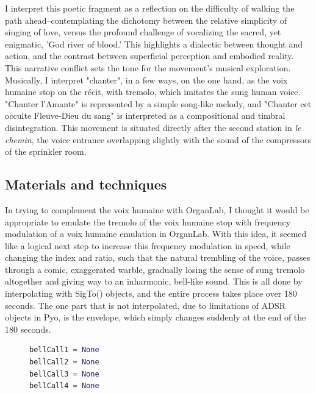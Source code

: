 \documentclass[12pt,twoside,maitrise]{dms_ks}
\theoremstyle{definition}
\begin{document}
{I interpret this poetic fragment as a reflection on the difficulty of walking the path ahead--contemplating the dichotomy between the relative simplicity of singing of love, versus the profound challenge of vocalizing the sacred, yet enigmatic, 'God river of blood.'  
This highlights a dialectic between thought and action, and the contrast between superficial perception and embodied reality.  
This narrative conflict sets the tone for the movement's musical exploration.  
Musically, I interpret "chanter", in a few ways, on the one hand, as the voix humaine stop on the récit, with tremolo, which imitates the sung human voice.  
"Chanter l'Amante" is represented by a simple song-like melody, and "Chanter cet occulte Fleuve-Dieu du sang" is interpreted as a compositional and timbral disintegration. 
This movement is situated directly after the second station in \textit{le chemin}, the voice entrance overlapping slightly with the sound of the compressors of the sprinkler room.

\subsection{Materials and techniques}

In trying to complement the voix humaine with OrganLab, I thought it would be appropriate to emulate the tremolo of the voix humaine stop with frequency modulation of a voix humaine emulation in OrganLab.  
With this idea, it seemed like a logical next step to increase this frequency modulation in speed, while changing the index and ratio, such that the natural trembling of the voice, passes through a comic, exaggerated warble, gradually losing the sense of sung tremolo altogether and giving way to an inharmonic, bell-like sound.  
This is all done by interpolating with SigTo() objects, and the entire process takes place over 180 seconds.  
The one part that is not interpolated, due to limitations of ADSR objects in Pyo, is the envelope, which simply changes suddenly at the end of the 180 seconds.

\begin{figure}[H]  
\begin{lstlisting}[language=Python]  
bellCall1 = None  
bellCall2 = None  
bellCall3 = None  
bellCall4 = None


\end{lstlisting}
\end{figure}}
\end{document}
